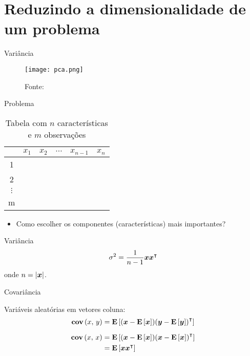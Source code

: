 \section{Reduzindo a dimensionalidade de um problema}

\begin{frame}{Variância}
  \begin{figure}[t]
    \texttt{[image: pca.png]}
    \caption{Fonte: \cite{scholz2006approaches}}
    \centering
  \end{figure}
\end{frame}

\begin{frame}{Problema}

  \begin{table}
    \centering
    \begin{tabular}{ |c|c|c|c|c|c| }
    \hline
    & $x_1$ & $x_2$ & $\cdots$ & $x_{n-1}$ & $x_{n}$ \\ 
    \hline
    1 & & & & & \\ 
    \hline
    2 & & & & & \\ 
    \hline
    $\vdots$ & & & & & \\ 
    \hline
    m & & & & & \\ 
    \hline
    \end{tabular}
    \caption{Tabela com $n$ características e $m$ observações}
  \end{table}

  \begin{itemize}
    \item Como escolher os componentes (características) mais importantes?
  \end{itemize}

\end{frame}

\begin{frame}{Variância}
  \[ \sigma^2 = \frac{1}{n-1} \boldsymbol{x} {\boldsymbol{x}}^\intercal \]
  onde $n = \lvert\boldsymbol{x}\rvert$.
\end{frame}

\begin{frame}{Covariância}
  \begin{defn}{Variáveis aleatórias em vetores coluna:}
    \[ \textbf{cov}\left(x,\, y\right) = \mathbf{E}\left[(\boldsymbol{x} - \mathbf{E}\left[\boldsymbol{x}\right]) {(\boldsymbol{y} - \mathbf{E}\left[\boldsymbol{y}\right])}^\intercal\right] \]

    \begin{align*}
      \textbf{cov}\left(x,\, x\right) &= \mathbf{E}\left[(\boldsymbol{x} - \mathbf{E}\left[\boldsymbol{x}\right]) {(\boldsymbol{x} - \mathbf{E}\left[\boldsymbol{x}\right])}^\intercal\right]\\
      &= \mathbf{E}\left[\boldsymbol{x} {\boldsymbol{x}}^\intercal\right]
    \end{align*}
  \end{defn}
\end{frame}
